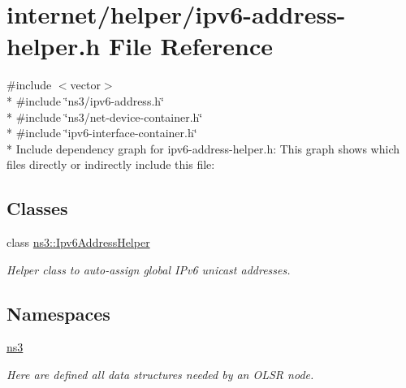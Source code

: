 \hypertarget{ipv6-address-helper_8h}{}\section{internet/helper/ipv6-\/address-\/helper.h File Reference}
\label{ipv6-address-helper_8h}
{\ttfamily \#include $<$vector$>$}\\*
{\ttfamily \#include \char`\"{}ns3/ipv6-\/address.\+h\char`\"{}}\\*
{\ttfamily \#include \char`\"{}ns3/net-\/device-\/container.\+h\char`\"{}}\\*
{\ttfamily \#include \char`\"{}ipv6-\/interface-\/container.\+h\char`\"{}}\\*
Include dependency graph for ipv6-\/address-\/helper.h\+:
This graph shows which files directly or indirectly include this file\+:
\subsection*{Classes}
\begin{DoxyCompactItemize}
\item 
class \hyperlink{classns3_1_1Ipv6AddressHelper}{ns3\+::\+Ipv6\+Address\+Helper}
\begin{DoxyCompactList}\small\item\em Helper class to auto-\/assign global I\+Pv6 unicast addresses. \end{DoxyCompactList}\end{DoxyCompactItemize}
\subsection*{Namespaces}
\begin{DoxyCompactItemize}
\item 
 \hyperlink{namespacens3}{ns3}
\begin{DoxyCompactList}\small\item\em Here are defined all data structures needed by an O\+L\+SR node. \end{DoxyCompactList}\end{DoxyCompactItemize}
